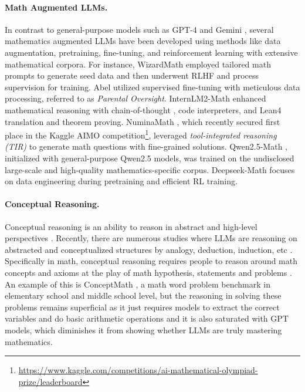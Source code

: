 \paragraph{Math Augmented LLMs.} In contrast to general-purpose models such as GPT-4 \cite{openai2023gpt4} and Gemini \cite{geminiteam2024gemini}, several mathematics augmented LLMs have been developed using methods like data augmentation, pretraining, fine-tuning, and reinforcement learning with extensive mathematical corpora. For instance, WizardMath \cite{luo2023wizardmath} employed tailored math prompts to generate seed data and then underwent RLHF and process supervision for training. Abel \cite{abel} utilized supervised fine-tuning with meticulous data processing, referred to as \textit{Parental Oversight}. InternLM2-Math \cite{ying2024internlm} enhanced mathematical reasoning with chain-of-thought \cite{wei2022chain}, code interpreters, and Lean4 translation and theorem proving. NuminaMath \cite{numina_math}, which recently secured first place in the Kaggle AIMO competition\footnote{\url{https://www.kaggle.com/competitions/ai-mathematical-olympiad-prize/leaderboard}}, leveraged \textit{tool-integrated reasoning (TIR)} to generate math questions with fine-grained solutions. Qwen2.5-Math \cite{yang2024qwen2}, initialized with general-purpose Qwen2.5 models, was trained on the undisclosed large-scale and high-quality mathematics-specific corpus. Deepseek-Math \cite{shao2024deepseekmath} focuses on data engineering during pretraining and efficient RL training. 

\paragraph{Conceptual Reasoning.} Conceptual reasoning is an ability to reason in abstract and high-level perspectives \cite{wang2024role,DBLP:conf/coling/HuangMLHZ0Z24, li2024llms,li2025correct}. Recently, there are numerous studies where LLMs are reasoning on abstracted and conceptualized structures by analogy, deduction, induction, etc \cite{saparov2023testing,li2023towards,yasunaga2024large,xu2024let,wang2024hypothesis,cheng2024inductive, zhou2024conceptual}. Specifically in math, conceptual reasoning requires people to reason around math concepts and axioms at the play of math hypothesis, statements and problems \cite{simon2011studying}. An example of this is ConceptMath \cite{wu2024conceptmath}, a math word problem benchmark in elementary school and middle school level, but the reasoning in solving these problems remains superficial as it just requires models to extract the correct variables and do basic arithmetic operations and it is also saturated with GPT models, which diminishes it from showing whether LLMs are truly mastering mathematics.